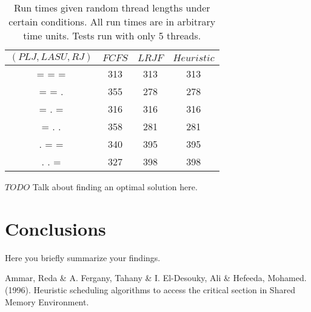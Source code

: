 \documentclass[letterpaper,12pt]{article}
\begin{document}
\begin{table}[ht]
\begin{center}
\caption{Run times given random thread lengths under certain conditions. All run times are in arbitrary time units. Tests run with only 5 threads.}
\begin{tabular}{|c|ccc|} 
\hline
\multicolumn{1}{|c|}{$(PLJ, LASU, RJ)$} &
\multicolumn{1}{c}{$FCFS$} &
\multicolumn{1}{c}{$LRJF$} &
\multicolumn{1}{c|}{$Heuristic$} \\
\hline
= = = & 313 & 313 & 313 \\
= = .  & 355 & 278 & 278 \\
= . = & 316 & 316 & 316 \\
= . . & 358 & 281 & 281 \\
. = = & 340 & 395 & 395 \\
. . = & 327 & 398 & 398 \\
\hline
\end{tabular}
\end{center}
\end{table}

$TODO$ Talk about finding an optimal solution here.  


\section{Conclusions}
Here you briefly summarize your findings.


\begin{thebibliography}{99}

Ammar, Reda \& A. Fergany, Tahany \& I. El-Desouky, Ali \& Hefeeda, Mohamed. (1996). Heuristic scheduling algorithms to access the critical section in Shared Memory Environment. 

\end{thebibliography}
\end{document}
